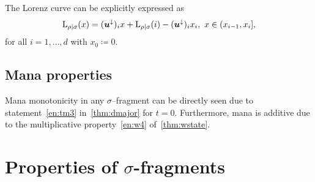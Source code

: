 The Lorenz curve can be explicitly expressed as
    \begin{equation}
		{{\rm{L}}_{\rho|\sigma}}(x) = (\bm{u}^\downarrow)_i x + {{\rm{L}}_{\rho|\sigma}}(i) - (\bm{u}^\downarrow)_i x_i,\ x \in (x_{i-1}, x_i],
	\end{equation}
	for all $i=1,\dots,d$ with $x_0 \coloneqq 0$.

\subsection{Mana properties}
Mana monotonicity in any $\sigma$--fragment can be directly seen due to statement~\ref{en:tm3} in~\cref{thm:dmajor} for $t=0$.
Furthermore, mana is additive due to the multiplicative property~\ref{en:w4} of~\cref{thm:wstate}.


\section{Properties of $\sigma$-fragments}
\label{app:frag}

